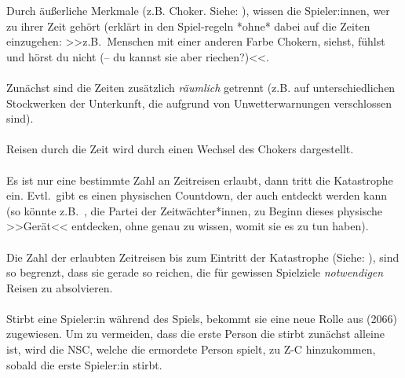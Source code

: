 Durch äußerliche Merkmale (z.B. Choker. Siehe:
), wissen die Spieler:innen, wer zu ihrer Zeit
gehört (erklärt in den Spiel-regeln *ohne* dabei auf die Zeiten einzugehen:
>>z.B.~Menschen mit einer anderen Farbe Chokern, siehst, fühlst und hörst du
nicht (-- du kannst sie aber riechen?)<<.\\\\
%
Zunächst sind die Zeiten zusätzlich \emph{räumlich} getrennt (z.B. auf
unterschiedlichen Stockwerken der Unterkunft, die aufgrund von
Unwetterwarnungen verschlossen sind).\\\\
%
Reisen durch die Zeit wird durch einen Wechsel des Chokers dargestellt.\\\\
%
Es ist nur eine bestimmte Zahl an Zeitreisen erlaubt, dann tritt die
Katastrophe ein. Evtl.~gibt es einen physischen Countdown, der auch entdeckt
werden kann (so könnte z.B.~, die Partei der
Zeitwächter*innen, zu Beginn dieses physische >>Gerät<< entdecken, ohne
genau zu wissen, womit sie es zu tun haben).\\\\
%
Die Zahl der erlaubten Zeitreisen bis zum Eintritt der Katastrophe
(Siehe: ), sind so begrenzt, dass sie gerade so
reichen, die für gewissen Spielziele \emph{notwendigen} Reisen zu
absolvieren.\\\\
%
Stirbt eine Spieler:in während des Spiels, bekommt sie eine neue Rolle
aus  (2066) zugewiesen. Um zu vermeiden, dass die erste
Person die stirbt zunächst alleine ist, wird die NSC, welche die ermordete
Person spielt, zu Z-C hinzukommen, sobald die erste Spieler:in stirbt.\\\\
%
\\\\
%
\\\\
